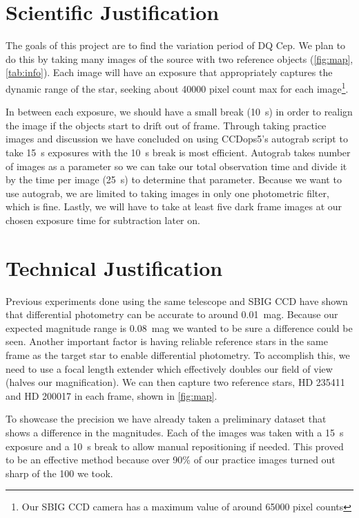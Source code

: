 \documentclass[]{article}
\begin{document}
\section{Scientific Justification}
	The goals of this project are to find the variation period of DQ Cep. We plan to do this by taking many images of the source with two reference objects (\autoref{fig:map}, \autoref{tab:info}). Each image will have an exposure that appropriately captures the dynamic range of the star, seeking about \num{40000} pixel count max for each image\footnote{Our SBIG CCD camera has a maximum value of around \num{65000} pixel counts}.

	In between each exposure, we should have a small break (\SI{10}{\second}) in order to realign the image if the objects start to drift out of frame. Through taking practice images and discussion we have concluded on using CCDops5's autograb script to take \SI{15}{\second} exposures with the \SI{10}{\second} break is most efficient. Autograb takes number of images as a parameter so we can take our total observation time and divide it by the time per image (\SI{25}{\second}) to determine that parameter. Because we want to use autograb, we are limited to taking images in only one photometric filter, which is fine. Lastly, we will have to take at least five dark frame images at our chosen exposure time for subtraction later on.


\section{Technical Justification}

	Previous experiments done using the same telescope and SBIG CCD have shown that differential photometry can be accurate to around \SI{0.01}{mag}. Because our expected magnitude range is \SI{0.08}{mag} we wanted to be sure a difference could be seen. Another important factor is having reliable reference stars in the same frame as the target star to enable differential photometry. To accomplish this, we need to use a focal length extender which effectively doubles our field of view (halves our magnification). We can then capture two reference stars, HD 235411 and HD 200017 in each frame, shown in \autoref{fig:map}.
	
	To showcase the precision we have already taken a preliminary dataset that shows a difference in the magnitudes. Each of the images was taken with a \SI{15}{\second} exposure and a \SI{10}{\second} break to allow manual repositioning if needed. This proved to be an effective method because over 90\% of our practice images turned out sharp of the 100 we took.
	
\end{document}

